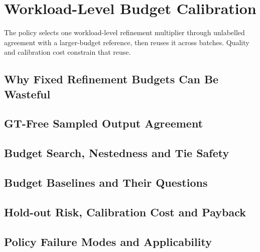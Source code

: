 \chapter{Workload-Level Budget Calibration}
\label{ch:refinement}
The policy selects one workload-level refinement multiplier through
unlabelled agreement with a larger-budget reference, then reuses it across
batches. Quality and calibration cost constrain that reuse.

\section{Why Fixed Refinement Budgets Can Be Wasteful}
\label{sec:6-1}


\section{GT-Free Sampled Output Agreement}
\label{sec:6-2}


\section{Budget Search, Nestedness and Tie Safety}
\label{sec:6-3}


\section{Budget Baselines and Their Questions}
\label{sec:6-4}


\section{Hold-out Risk, Calibration Cost and Payback}
\label{sec:6-5}


\section{Policy Failure Modes and Applicability}
\label{sec:6-6}

